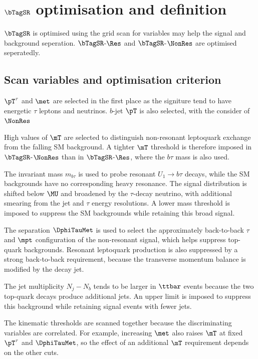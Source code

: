 \section[$\bTagSR$ optimisation and definition]{$\bTagSR$ optimisation and definition}
\label{sec:ch7_sr1b}

$\bTagSR$ is optimised using the grid scan for variables may help the signal and background seperation. $\bTagSR$-$\Res$ and $\bTagSR$-$\NonRes$ are optimised seperatedly. %

\subsection{Scan variables and optimisation criterion}
\label{subsec:ch7_scan}

$\pT^\tau$ and $\met$ are selected in the first place as the signiture tend to have energetic $\tau$ leptons and neutrinos.
$b$-jet $\pT$ is also selected, with the consider of $\NonRes$ 

High values of $\mT$ are selected to distinguish non-resonant leptoquark exchange from the falling SM background.
A tighter $\mT$ threshold is therefore imposed in $\bTagSR$-$\NonRes$ than in $\bTagSR$-$\Res$, where the $b\tau$ mass is also used.

The invariant mass $m_{b\tau}$ is used to probe resonant $U_1\to b\tau$ decays, while the SM backgrounds have no corresponding heavy resonance.
The signal distribution is shifted below $\MU$ and broadened by the $\tau$-decay neutrino, with additional smearing from the jet and $\tau$ energy resolutions.
A lower mass threshold is imposed to suppress the SM backgrounds while retaining this broad signal.

The separation $\DphiTauMet$ is used to select the approximately back-to-back $\tau$ and $\mpt$ configuration of the non-resonant signal, which helps suppress top-quark backgrounds.
Resonant leptoquark production is also suppressed by a strong back-to-back requirement, because the transverse momentum balance is modified by the decay jet.

The jet multiplicity $N_j-N_b$ tends to be larger in $\ttbar$ events because the two top-quark decays produce additional jets.
An upper limit is imposed to suppress this background while retaining signal events with fewer jets.

The kinematic thresholds are scanned together because the discriminating variables are correlated.
For example, increasing $\met$ also raises $\mT$ at fixed $\pT^\tau$ and $\DphiTauMet$, so the effect of an additional $\mT$ requirement depends on the other cuts.


